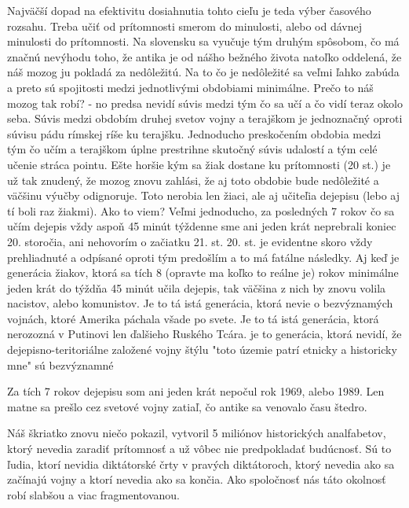\documentclass[11pt]{extarticle}
\begin{document}
		Najväčší dopad na efektivitu dosiahnutia tohto cieľu je teda výber časového rozsahu.
		Treba učiť od prítomnosti smerom do minulosti, alebo od dávnej minulosti do prítomnosti.
		Na slovensku sa vyučuje tým druhým spôsobom, čo má značnú nevýhodu toho, že antika je od nášho bežného života natoľko oddelená, že náš mozog ju pokladá za nedôležitú.
		Na to čo je nedôležité sa veľmi ľahko zabúda a preto sú spojitosti medzi jednotlivými obdobiami minimálne.
		Prečo to náš mozog tak robí? - no predsa nevidí súvis medzi tým čo sa učí a čo vidí teraz okolo seba.
		Súvis medzi obdobím druhej svetov vojny a terajškom je jednoznačný oproti súvisu pádu rímskej ríše ku terajšku.
		Jednoducho preskočením obdobia medzi tým čo učím a terajškom úplne prestrihne skutočný súvis udalostí a tým celé učenie stráca pointu.
		Ešte horšie kým sa žiak dostane ku prítomnosti (20 st.) je už tak znudený, že mozog znovu zahlási, že aj toto obdobie bude nedôležité a väčšinu výučby odignoruje.
		Toto nerobia len žiaci, ale aj učiteľia dejepisu (lebo aj tí boli raz žiakmi).
		Ako to viem? Veľmi jednoducho, za posledných 7 rokov čo sa učím dejepis vždy aspoň 45 minút týždenne sme ani jeden krát neprebrali koniec 20. storočia, ani nehovorím o začiatku 21. st.
		20. st. je evidentne skoro vždy prehliadnuté a odpísané oproti tým predošlím a to má fatálne následky.
		Aj keď je generácia žiakov, ktorá sa tích 8 (opravte ma koľko to reálne je) rokov minimálne jeden krát do týždňa 45 minút učila dejepis, tak väčšina z nich
		by znovu volila nacistov, alebo komunistov.
		Je to tá istá generácia, ktorá nevie o bezvýznamých vojnách, ktoré Amerika páchala všade po svete.
		Je to tá istá generácia, ktorá nerozozná v Putinovi len ďalšieho Ruského Tcára.
		je to generácia, ktorá nevidí, že dejepisno-teritoriálne založené vojny štýlu "toto územie patrí etnicky a historicky mne" sú bezvýznamné
		
		Za tích 7 rokov dejepisu som ani jeden krát nepočul rok 1969, alebo 1989.
		Len matne sa prešlo cez svetové vojny zatiaľ, čo antike sa venovalo času štedro.
		
		Náš škriatko znovu niečo pokazil, vytvoril 5 miliónov historických analfabetov, ktorý nevedia zaradiť prítomnosť a už vôbec nie predpokladať budúcnosť.
		Sú to ľudia, ktorí nevidia diktátorské črty v pravých diktátoroch, ktorý nevedia ako sa začínajú vojny a ktorí nevedia ako sa končia.
		Ako spoločnosť nás táto okolnosť robí slabšou a viac fragmentovanou.
\end{document}
